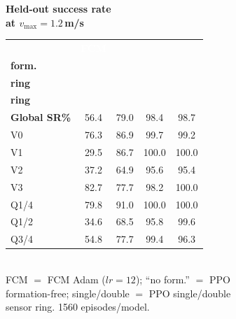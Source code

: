 \documentclass[11pt]{article}
\begin{document}
\centering
{\bfseries Held-out success rate\\[1pt] at $v_{\max}=1.2$\,m/s}\\[9pt]
\begin{tabular}{l c c c c}
\toprule
\rowcolor{headerbg}
\textcolor{white}{\textbf{}} &
\textcolor{white}{\textbf{FCM}} &
\textcolor{white}{\shortstack{\textbf{no}\\[-1pt]\textbf{form.}}} &
\textcolor{white}{\shortstack{\textbf{single}\\[-1pt]\textbf{ring}}} &
\textcolor{white}{\shortstack{\textbf{double}\\[-1pt]\textbf{ring}}} \\
\midrule
\textbf{Global SR\%} & 56.4 & 79.0 & 98.4 & 98.7 \\
\midrule
V0   & 76.3 & 86.9 & 99.7  & 99.2 \\
\rowcolor{rowalt}
V1   & 29.5 & 86.7 & 100.0 & 100.0 \\
V2   & 37.2 & 64.9 & 95.6  & 95.4 \\
\rowcolor{rowalt}
V3   & 82.7 & 77.7 & 98.2  & 100.0 \\
\midrule
Q1/4 & 79.8 & 91.0 & 100.0 & 100.0 \\
\rowcolor{rowalt}
Q1/2 & 34.6 & 68.5 & 95.8  & 99.6 \\
Q3/4 & 54.8 & 77.7 & 99.4  & 96.3 \\
\bottomrule
\end{tabular}\\[8pt]
{\footnotesize FCM $=$ FCM Adam ($lr{=}12$); ``no form.'' $=$ PPO\\[-1pt]
formation-free; single/double $=$ PPO single/double\\[-1pt]
sensor ring. 1560 episodes/model.}
\end{document}
